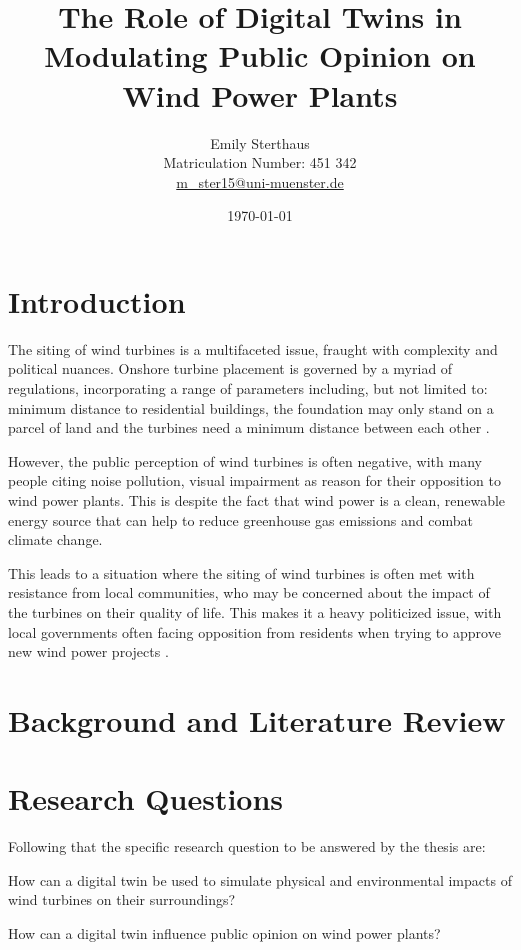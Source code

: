 \documentclass[11pt, titlepage, a4paper]{article}
\title{The Role of Digital Twins in Modulating Public Opinion on Wind Power Plants}
\author{Emily Sterthaus \\ Matriculation Number: 451 342 \\ \href{mailto:m_ster15@uni-muenster.de}{m\_ster15@uni-muenster.de}}
\affil{Institute of Geoinformatics, University of Münster}
\date{\today}
\begin{document}
\maketitle


\newpage
\begin{linenumbers}
    \section{Introduction}
    The siting of wind turbines is a multifaceted issue, fraught with complexity and political nuances. Onshore
    turbine placement is governed by a myriad of regulations, incorporating a range of parameters including, but not
    limited to: minimum distance to residential buildings, the foundation may only stand on a parcel of land and the
    turbines need a minimum distance between each other
    \cite{niedersachsischesministeriumfurumweltenergieundklimaschutzPlanungUndGenehmigung2021}.

    However, the public perception of wind turbines is often negative, with many people citing noise pollution, visual impairment as reason for their opposition to wind power plants. This is despite the fact that wind power is a clean, renewable energy source that can help to reduce greenhouse gas emissions and combat climate change.

    This leads to a situation where the siting of wind turbines is often met with resistance from local communities, who may be concerned about the impact of the turbines on their quality of life. This makes it a heavy politicized issue, with local governments often facing opposition from residents when trying to approve new wind power projects \cite{kwasniewskiWindenergieVerhindertAntiWindkraftBewegung2021}.


    \section{Background and Literature Review}

    \section{Research Questions}
    Following that the specific research question to be answered by the thesis are:
    \begin{questions}
        \item How can a digital twin be used to simulate physical and environmental impacts of wind turbines on their surroundings?
        \item How can a digital twin influence public opinion on wind power plants?
    \end{questions}


\end{linenumbers}
\end{document}

